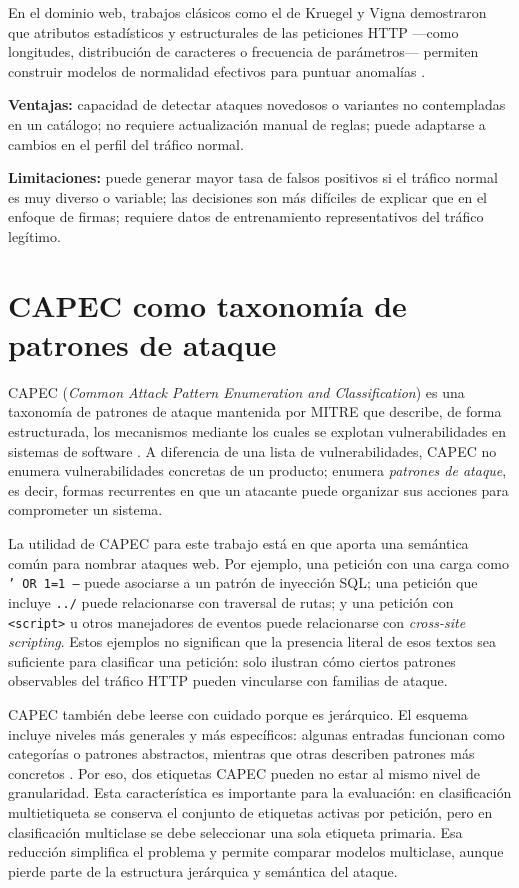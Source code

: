 \documentclass[12pt,oneside]{report}
\begin{document}
En el dominio web, trabajos clásicos como el de Kruegel y Vigna demostraron que atributos estadísticos y estructurales de las peticiones HTTP —como longitudes, distribución de caracteres o frecuencia de parámetros— permiten construir modelos de normalidad efectivos para puntuar anomalías \cite{kruegel_vigna_2003}.

\textbf{Ventajas:} capacidad de detectar ataques novedosos o variantes no contempladas en un catálogo; no requiere actualización manual de reglas; puede adaptarse a cambios en el perfil del tráfico normal.

\textbf{Limitaciones:} puede generar mayor tasa de falsos positivos si el tráfico normal es muy diverso o variable; las decisiones son más difíciles de explicar que en el enfoque de firmas; requiere datos de entrenamiento representativos del tráfico legítimo.

\section{CAPEC como taxonomía de patrones de ataque}

CAPEC (\textit{Common Attack Pattern Enumeration and Classification}) es una taxonomía de patrones de ataque mantenida por MITRE que describe, de forma estructurada, los mecanismos mediante los cuales se explotan vulnerabilidades en sistemas de software \cite{capec_home,capec_about}. A diferencia de una lista de vulnerabilidades, CAPEC no enumera vulnerabilidades concretas de un producto; enumera \textit{patrones de ataque}, es decir, formas recurrentes en que un atacante puede organizar sus acciones para comprometer un sistema.

La utilidad de CAPEC para este trabajo está en que aporta una semántica común para nombrar ataques web. Por ejemplo, una petición con una carga como \texttt{' OR 1=1 --} puede asociarse a un patrón de inyección SQL; una petición que incluye \texttt{../} puede relacionarse con traversal de rutas; y una petición con \texttt{<script>} u otros manejadores de eventos puede relacionarse con \textit{cross-site scripting}. Estos ejemplos no significan que la presencia literal de esos textos sea suficiente para clasificar una petición: solo ilustran cómo ciertos patrones observables del tráfico HTTP pueden vincularse con familias de ataque.

CAPEC también debe leerse con cuidado porque es jerárquico. El esquema incluye niveles más generales y más específicos: algunas entradas funcionan como categorías o patrones abstractos, mientras que otras describen patrones más concretos \cite{capec_schema_docs,capec_schema_desc}. Por eso, dos etiquetas CAPEC pueden no estar al mismo nivel de granularidad. Esta característica es importante para la evaluación: en clasificación multietiqueta se conserva el conjunto de etiquetas activas por petición, pero en clasificación multiclase se debe seleccionar una sola etiqueta primaria. Esa reducción simplifica el problema y permite comparar modelos multiclase, aunque pierde parte de la estructura jerárquica y semántica del ataque.
\end{document}

